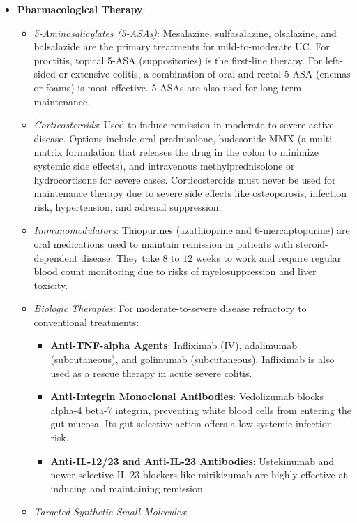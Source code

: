 \begin{itemize}
  \item \textbf{Pharmacological Therapy}:
  \begin{itemize}
    \item \textit{5-Aminosalicylates (5-ASAs)}: Mesalazine, sulfasalazine, olsalazine, and balsalazide are the primary treatments for mild-to-moderate UC. For proctitis, topical 5-ASA (suppositories) is the first-line therapy. For left-sided or extensive colitis, a combination of oral and rectal 5-ASA (enemas or foams) is most effective. 5-ASAs are also used for long-term maintenance.
    \item \textit{Corticosteroids}: Used to induce remission in moderate-to-severe active disease. Options include oral prednisolone, budesonide MMX (a multi-matrix formulation that releases the drug in the colon to minimize systemic side effects), and intravenous methylprednisolone or hydrocortisone for severe cases. Corticosteroids must never be used for maintenance therapy due to severe side effects like osteoporosis, infection risk, hypertension, and adrenal suppression.
    \item \textit{Immunomodulators}: Thiopurines (azathioprine and 6-mercaptopurine) are oral medications used to maintain remission in patients with steroid-dependent disease. They take $8$ to $12$ weeks to work and require regular blood count monitoring due to risks of myelosuppression and liver toxicity.
    \item \textit{Biologic Therapies}: For moderate-to-severe disease refractory to conventional treatments:
    \begin{itemize}
      \item \textbf{Anti-TNF-alpha Agents}: Infliximab (IV), adalimumab (subcutaneous), and golimumab (subcutaneous). Infliximab is also used as a rescue therapy in acute severe colitis.
      \item \textbf{Anti-Integrin Monoclonal Antibodies}: Vedolizumab blocks alpha-4 beta-7 integrin, preventing white blood cells from entering the gut mucosa. Its gut-selective action offers a low systemic infection risk.
      \item \textbf{Anti-IL-12/23 and Anti-IL-23 Antibodies}: Ustekinumab and newer selective IL-23 blockers like mirikizumab are highly effective at inducing and maintaining remission.
    \end{itemize}
    \item \textit{Targeted Synthetic Small Molecules}:
    \begin{itemize}

\end{itemize}
\end{itemize}
\end{itemize}
